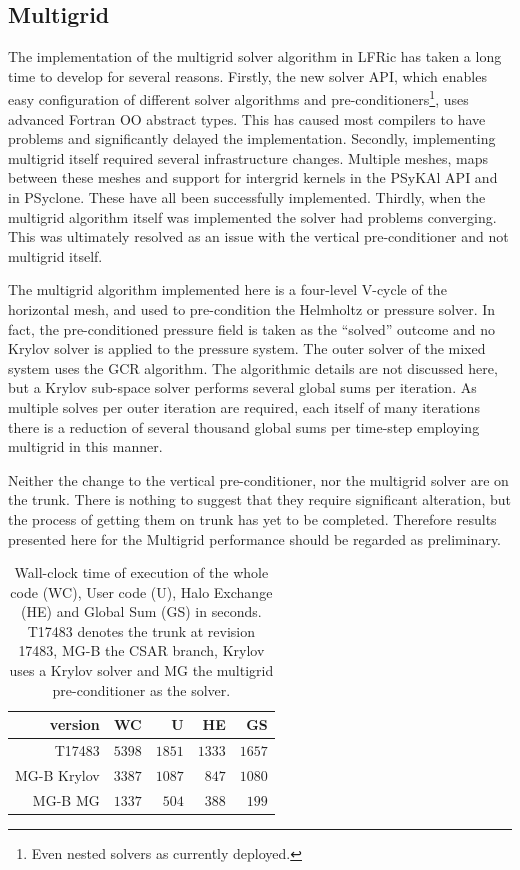 \subsection{\label{sec:multigrid}Multigrid}
The implementation of the multigrid solver algorithm in LFRic has taken a
long time to develop for several reasons. Firstly, the new solver API,
which enables easy configuration of different solver algorithms and
pre-conditioners\footnote{Even nested solvers as currently deployed.},
uses advanced Fortran OO abstract types. This has caused most
compilers to have problems and significantly delayed the
implementation. Secondly, implementing multigrid itself required
several infrastructure changes. Multiple meshes, maps between these
meshes and support for intergrid kernels in the PSyKAl API and in
PSyclone. These have all been successfully implemented. Thirdly, when
the multigrid algorithm itself was implemented the solver had problems
converging.
This was ultimately resolved as an issue with the vertical
pre-conditioner and not multigrid itself. 

The multigrid algorithm implemented here is a four-level V-cycle of
the horizontal mesh, and used to pre-condition the Helmholtz or
pressure solver. In fact, the pre-conditioned pressure field is taken
as the ``solved'' outcome and no Krylov solver is applied
to the pressure system. The outer solver of the mixed system uses the
GCR algorithm. The algorithmic details are not discussed here, but a
Krylov sub-space solver performs several global sums per iteration. As
multiple solves per outer iteration are required, each itself of many
iterations there is a reduction of several thousand global sums per
time-step employing multigrid in this manner.

Neither the change to the vertical pre-conditioner, nor the multigrid
solver are on the trunk. There is nothing to suggest that they require
significant alteration, but the process of getting them on trunk has
yet to be completed. Therefore results presented here for the
Multigrid performance should be regarded as preliminary.

\begin{table}
\centering
\caption{\label{tab:MG_data}Wall-clock time of execution of the whole code (WC), User
  code (U), Halo Exchange (HE) and Global Sum (GS) in seconds. T17483
  denotes the trunk at revision 17483, MG-B the CSAR branch,
  Krylov uses a Krylov solver and MG the multigrid pre-conditioner as
  the solver.
}
\begin{tabular}{r|rrrr}
version     & WC     & U      & HE     & GS \\\hline
T17483      & $5398$ & $1851$ & $1333$ & $1657$ \\
MG-B Krylov & $3387$ & $1087$ & $847$  & $1080$ \\
MG-B MG     & $1337$ & $504$  & $388$  & $199$ \\\hline
\end{tabular}
\end{table}

